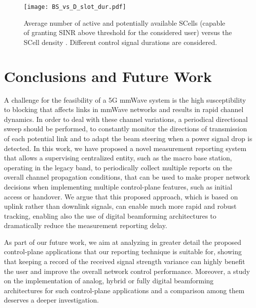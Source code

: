 \documentclass[conference,a4paper]{IEEEtran}
\begin{document}
\begin{figure}[t!]
\centering
 \texttt{[image: BS\_vs\_D\_slot\_dur.pdf]}
 \caption{Average number of active and potentially available SCells (capable of granting SINR above threshold for the considered user) versus the SCell density . Different control signal durations  are considered.}
 \label{fig:BS_vs_D}
\end{figure}



\section{Conclusions and Future Work}
\label{conclu}

A  challenge for the feasibility of a 5G mmWave system is the high susceptibility to blocking that affects links in mmWave networks and results in rapid channel dynamics.
In order to deal with these channel variations, a periodical directional sweep should be performed, to constantly monitor the directions of transmission of each potential link and to adapt the beam steering when a power signal drop is detected.
In this work, we have proposed a novel measurement reporting system that allows a supervising centralized entity, such as the macro base station, operating in the legacy band, to periodically collect multiple reports on the overall channel propagation conditions, that can be used to make proper network decisions when implementing multiple control-plane features, such as initial access or handover.
We argue that this proposed approach, which is based on uplink rather than downlink signals, can enable much more rapid and robust tracking, enabling also the use of digital beamforming architectures to dramatically reduce the measurement reporting delay.

As part of our future work, we aim at analyzing in greater detail the proposed control-plane applications that our reporting technique is suitable for, showing that keeping a record of the received signal strength variance can highly benefit the user and improve the overall network control performance. Moreover, a study on the implementation of analog, hybrid or fully digital beamforming architectures for such control-plane applications and a comparison among them deserves a deeper investigation.







\end{document}
